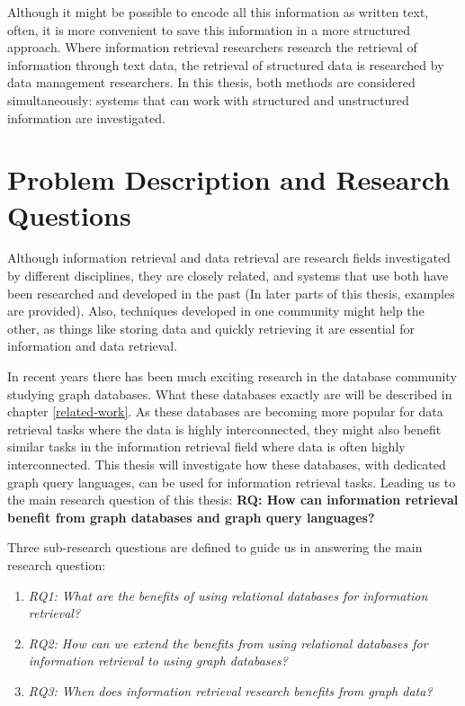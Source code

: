 Although it might be possible to encode all this information as written text, often, it is more convenient to save this information in a more structured approach. Where information retrieval researchers research the retrieval of information through text data, the retrieval of structured data is researched by data management researchers. In this thesis, both methods are considered simultaneously: systems that can work with structured and unstructured information are investigated.

\section{Problem Description and Research Questions}
Although information retrieval and data retrieval are research fields investigated by different disciplines, they are closely related, and systems that use both have been researched and developed in the past (In later parts of this thesis, examples are provided). Also, techniques developed in one community might help the other, as things like storing data and quickly retrieving it are essential for information and data retrieval. 

In recent years there has been much exciting research in the database community studying graph databases. What these databases exactly are will be described in chapter \ref{related-work}. As these databases are becoming more popular for data retrieval tasks where the data is highly interconnected, they might also benefit similar tasks in the information retrieval field where data is often highly interconnected. This thesis will investigate how these databases, with dedicated graph query languages, can be used for information retrieval tasks. Leading us to the main research question of this thesis: \textbf{RQ: How can information retrieval benefit from graph databases and graph query languages?}

Three sub-research questions are defined to guide us in answering the main research question:

\begin{enumerate}
	\item \emph{RQ1: What are the benefits of using relational databases for information retrieval?} 
	\item \emph{RQ2: How can we extend the benefits from using relational databases for information retrieval to using graph databases?} 
	\item \emph{RQ3: When does information retrieval research benefits from graph data?} 
\end{enumerate}

